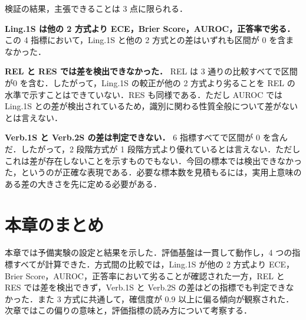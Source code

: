 検証の結果，主張できることは 3 点に限られる．

\textbf{Ling.1S は他の 2 方式より ECE，Brier Score，AUROC，正答率で劣る．}この 4 指標において，Ling.1S と他の 2 方式との差はいずれも区間が 0 を含まなかった．

\textbf{REL と RES では差を検出できなかった．} REL は 3 通りの比較すべてで区間が0 を含む．したがって，Ling.1S の較正が他の 2 方式より劣ることを REL の水準で示すことはできていない．RES も同様である．ただし AUROC では Ling.1S との差が検出されているため，識別に関わる性質全般について差がないとは言えない．

\textbf{Verb.1S と Verb.2S の差は判定できない．} 6 指標すべてで区間が 0 を含んだ．したがって，2 段階方式が 1 段階方式より優れているとは言えない．ただしこれは差が存在しないことを示すものでもない．今回の標本では検出できなかった，というのが正確な表現である．必要な標本数を見積もるには，実用上意味のある差の大きさを先に定める必要がある．

\section{本章のまとめ}

本章では予備実験の設定と結果を示した．評価基盤は一貫して動作し，4 つの指標すべてが計算できた．方式間の比較では，Ling.1S が他の 2 方式より ECE，Brier Score，AUROC，正答率において劣ることが確認された一方，REL と RES では差を検出できず，Verb.1S と Verb.2S の差はどの指標でも判定できなかった．また 3 方式に共通して，確信度が 0.9 以上に偏る傾向が観察された．次章ではこの偏りの意味と，評価指標の読み方について考察する．
